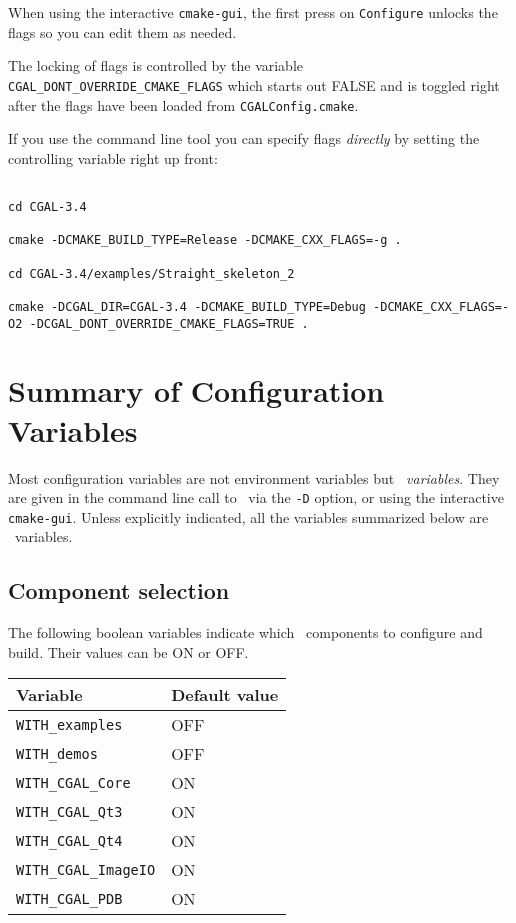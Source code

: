 When using the interactive \texttt{cmake-gui}, the first press on \texttt{Configure} unlocks
the flags so you can edit them as needed. 

\begin{ccAdvanced}
The locking of flags is controlled by the variable {\tt CGAL\_DONT\_OVERRIDE\_CMAKE\_FLAGS}
which starts out FALSE and is toggled right after the flags have been loaded from
\texttt{CGALConfig.cmake}.

If you use the command line tool you can specify flags {\em directly} by setting the
controlling variable right up front:

{\ccTexHtml{\scriptsize}{}
\begin{verbatim}

cd CGAL-3.4

cmake -DCMAKE_BUILD_TYPE=Release -DCMAKE_CXX_FLAGS=-g .

cd CGAL-3.4/examples/Straight_skeleton_2

cmake -DCGAL_DIR=CGAL-3.4 -DCMAKE_BUILD_TYPE=Debug -DCMAKE_CXX_FLAGS=-O2 -DCGAL_DONT_OVERRIDE_CMAKE_FLAGS=TRUE . 

\end{verbatim}
}
\end{ccAdvanced}






\section{Summary of Configuration Variables}

Most configuration variables are not environment variables but {\em \cmake\ variables}. They are given in the command line call to \cmake\ via the \texttt{-D} option, 
or using the interactive \texttt{cmake-gui}. Unless explicitly indicated, all the variables summarized below are \cmake\ variables.

\subsection{Component selection}

The following boolean variables indicate which \cgal\ components to configure and build. Their values can be ON or OFF.

\renewcommand{\arraystretch}{1.3}
\gdef\lcTabularBorder{2}
\begin{tabular}{|l|l|} \hline
  \textbf{Variable}            & \textbf{Default value}\\\hline\hline
  \texttt{WITH\_examples}      & OFF\\\hline
  \texttt{WITH\_demos}         & OFF\\\hline
  \texttt{WITH\_CGAL\_Core}    & ON\\\hline
  \texttt{WITH\_CGAL\_Qt3}     & ON\\\hline
  \texttt{WITH\_CGAL\_Qt4}     & ON\\\hline
  \texttt{WITH\_CGAL\_ImageIO} & ON\\\hline
  \texttt{WITH\_CGAL\_PDB}     & ON\\\hline
\end{tabular}

